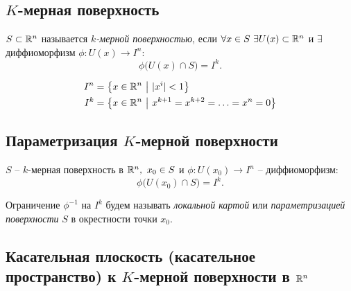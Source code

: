 \subsection{$ K $-мерная поверхность}

\begin{definition}
    $ S \subset \mathbb{R}^n $ называется \emph{$ k $-мерной поверхностью}, если $ \forall x \in S \ \exists U(x)\subset\R^n $ и $ \exists $ диффиоморфизм $ \phi: U(x)\rightarrow I^n $:
    \[
        \phi\big(U(x)\cap S\big) = I^k.
    \]
\end{definition}

\newpage

\begin{note}
    \begin{align*}
        I^n & = \big\{x \in \mathbb{R}^n \ \big| \ |x^i| < 1 \big\} \\
        I^k & = \big\{x \in \mathbb{R}^n \ \big| \ x^{k+1} = x^{k+2} = \ldots = x^n = 0\big\}
    \end{align*}
\end{note}

\subsection{Параметризация $ K $-мерной поверхности}

\begin{definition}
    $S$ -- $k$-мерная поверхность в $\mathbb{R}^n, \ x_0 \in S$ и $\phi: U(x_0) \rightarrow I^n$ -- диффиоморфизм:
    \[
        \phi\big(U(x_0)\cap S\big) = I^k.
    \]

    Ограничение $\phi^{-1}$ на $I^k$ будем называть \emph{локальной картой} или \emph{параметризацией поверхности} $S$ в окрестности точки $x_0$.
\end{definition}

\subsection{Касательная плоскость (касательное пространство) к $ K $-мерной поверхности в $ \mathbb{R}^n $}

